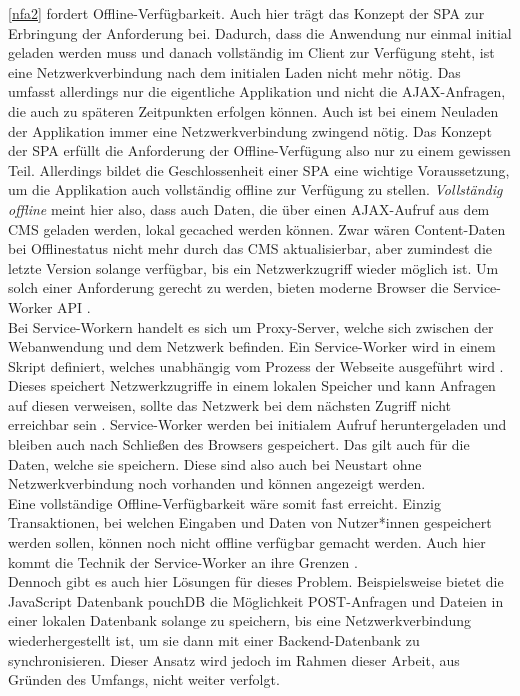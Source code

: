 \ref{nfa2} fordert Offline-Verfügbarkeit. Auch hier trägt das Konzept der SPA zur 
Erbringung der Anforderung bei. Dadurch, dass die Anwendung nur einmal initial geladen werden muss 
und danach vollständig im Client zur Verfügung steht, ist eine Netzwerkverbindung nach dem initialen 
Laden nicht mehr nötig. Das umfasst allerdings nur die eigentliche Applikation und nicht die
AJAX-Anfragen, die auch zu späteren Zeitpunkten erfolgen können. Auch ist bei einem Neuladen
der Applikation immer eine Netzwerkverbindung zwingend nötig. Das Konzept der SPA erfüllt
die Anforderung der Offline-Verfügung also nur zu einem gewissen Teil. Allerdings bildet die Geschlossenheit
einer SPA eine wichtige Voraussetzung, um die Applikation auch vollständig offline zur Verfügung
zu stellen. \emph{Vollständig offline} meint hier also, dass auch Daten, die über
einen AJAX-Aufruf aus dem CMS geladen werden, lokal gecached werden können. Zwar wären Content-Daten bei
Offlinestatus nicht mehr durch das CMS aktualisierbar, aber zumindest die letzte Version solange verfügbar,
bis ein Netzwerkzugriff wieder möglich ist. Um solch einer Anforderung gerecht zu werden, bieten moderne 
Browser die Service-Worker API \cite{service-worker-api}.\\ 
Bei Service-Workern handelt es sich um Proxy-Server, welche sich zwischen der Webanwendung und dem 
Netzwerk befinden. Ein Service-Worker wird in einem Skript definiert, welches
unabhängig vom Prozess der Webseite ausgeführt wird \cite{service-worker-intro}. 
Dieses speichert Netzwerkzugriffe in einem lokalen Speicher und kann Anfragen auf
diesen verweisen, sollte das Netzwerk bei dem nächsten Zugriff nicht erreichbar sein \cite{service-worker-api}.
Service-Worker werden bei initialem Aufruf heruntergeladen und bleiben auch nach Schließen des Browsers
gespeichert. Das gilt auch für die Daten, welche sie speichern. Diese sind also auch bei Neustart ohne
Netzwerkverbindung noch vorhanden und können angezeigt werden.\\
Eine vollständige Offline-Verfügbarkeit wäre somit fast erreicht. Einzig Transaktionen, bei welchen Eingaben
und Daten von Nutzer*innen gespeichert werden sollen, können noch nicht offline verfügbar gemacht werden.
Auch hier kommt die Technik der Service-Worker an ihre Grenzen \cite{service-worker-post}.\\
Dennoch gibt es auch hier Lösungen für dieses
Problem. Beispielsweise bietet die JavaScript Datenbank pouchDB \cite{pouchdb} die Möglichkeit POST-Anfragen
und Dateien in einer lokalen Datenbank solange zu speichern, bis eine Netzwerkverbindung wiederhergestellt ist,
um sie dann mit einer Backend-Datenbank zu synchronisieren. Dieser Ansatz wird jedoch im Rahmen dieser Arbeit,
aus Gründen des Umfangs, nicht weiter verfolgt.\\

